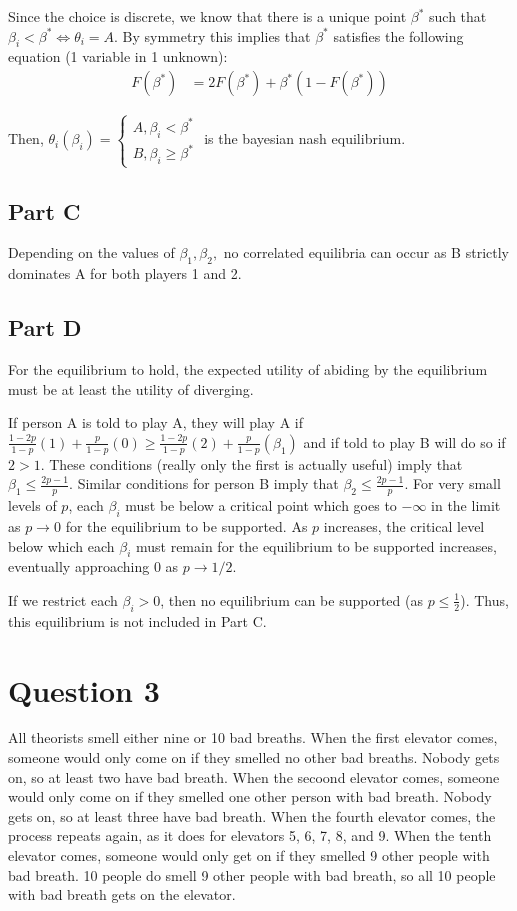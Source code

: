 \documentclass[11pt]{article} %
\begin{document}
Since the choice is discrete, we know that there is a unique point $\beta^{*}$ such that $\beta_i<\beta^{*}\iff\theta_i = A$. By symmetry this implies that $\beta^{*}$ satisfies the following equation (1 variable in 1 unknown):
\begin{align*}
F(\beta^{*})&=2F(\beta^{*}) + \beta^{*}(1-F(\beta^{*}))
\end{align*}

Then, $\theta_i(\beta_i) = \begin{cases} A, \beta_i<\beta^{*} \\ B, \beta_i\geq\beta^{*} \end{cases}$ is the bayesian nash equilibrium.
\subsection{Part C}
Depending on the values of $\beta_1,\beta_2,$ no correlated equilibria can occur as B strictly dominates A for both players 1 and 2. %
\subsection{Part D}
For the equilibrium to hold, the expected utility of abiding by the equilibrium must be at least the utility of diverging.

If person  A is told to play A, they will play A if $\frac{1-2p}{1-p}(1) + \frac{p}{1-p}(0)\geq \frac{1-2p}{1-p}(2) + \frac{p}{1-p}(\beta_1)$ and if told to play B will do so if $2>1$. These conditions (really only the first is actually useful) imply that $\beta_1 \leq \frac{2p-1}{p}$. Similar conditions for person B imply that $\beta_2 \leq \frac{2p-1}{p}$. For very small levels of $p$, each $\beta_i$ must be below a critical point which goes to $-\infty$ in the limit as $p\rightarrow 0$ for the equilibrium to be supported. As $p$ increases, the critical level below which each $\beta_i$ must  remain for the equilibrium to be supported increases, eventually approaching $0$ as $p\rightarrow 1/2$.

If we restrict each $\beta_i>0$, then no equilibrium can be supported (as $p\leq\frac{1}{2}$). Thus, this equilibrium is not included in Part C.
\section{Question 3}
All theorists smell either nine or 10 bad breaths. When the first elevator comes, someone would only come on if they smelled no other bad breaths. Nobody gets on, so at least two have bad breath. When the secoond elevator comes, someone would only come on if they smelled one other person with bad breath. Nobody gets on, so at least three have bad breath. When the fourth elevator comes, the process repeats again, as it does for elevators 5, 6, 7, 8, and 9. When the tenth elevator comes, someone would only get on if they smelled 9 other people with bad breath. 10 people do smell 9 other people with bad breath, so all 10 people with bad breath gets on the elevator.
\end{document}
